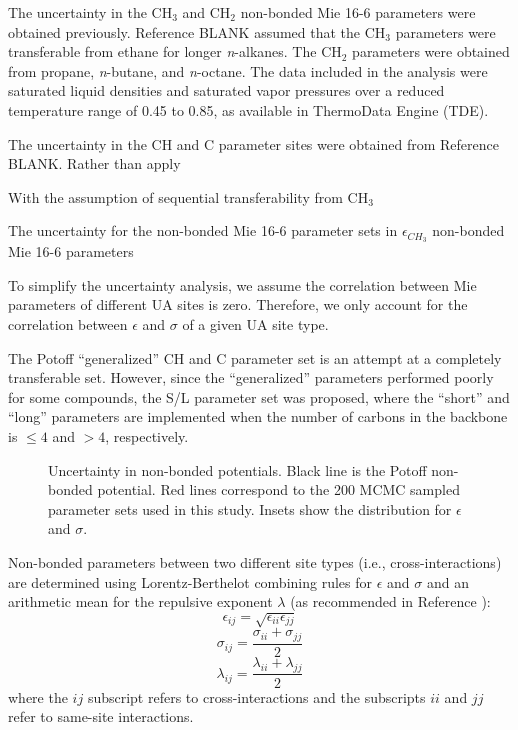 \documentclass[preprint,review,12pt]{elsarticle}
\begin{document}
	The uncertainty in the CH$_3$ and CH$_2$ non-bonded Mie 16-6 parameters were obtained previously. Reference BLANK assumed that the CH$_3$ parameters were transferable from ethane for longer \textit{n}-alkanes. The CH$_2$ parameters were obtained from propane, \textit{n}-butane, and \textit{n}-octane. The data included in the analysis were saturated liquid densities and saturated vapor pressures over a reduced temperature range of 0.45 to 0.85, as available in ThermoData Engine (TDE). 
	
	The uncertainty in the CH and C parameter sites were obtained from Reference BLANK. Rather than apply 
	
	With the assumption of sequential transferability from CH$_3$ 
	
	The uncertainty for the non-bonded Mie 16-6 parameter sets in $\epsilon_{CH_3}$ non-bonded Mie 16-6 parameters
	
	To simplify the uncertainty analysis, we assume the correlation between Mie parameters of different UA sites is zero. Therefore, we only account for the correlation between $\epsilon$ and $\sigma$ of a given UA site type.  
	
	The Potoff ``generalized'' CH and C parameter set is an attempt at a completely transferable set. However, since the ``generalized'' parameters performed poorly for some compounds, the S/L parameter set was proposed, where the ``short'' and ``long'' parameters are implemented when the number of carbons in the backbone is $\le 4$ and $> 4$, respectively.
	
	\begin{figure}[htb!]
	\centering
	\caption{Uncertainty in non-bonded potentials. Black line is the Potoff non-bonded potential. Red lines correspond to the 200 MCMC sampled parameter sets used in this study. Insets show the distribution for $\epsilon$ and $\sigma$.}
		\label{fig:nonbonded_uncertainty}
	\end{figure}
	
	Non-bonded parameters between two different site types (i.e., cross-interactions) are determined using Lorentz-Berthelot combining rules \cite{Allen1987} for $\epsilon$ and $\sigma$ and an arithmetic mean for the repulsive exponent $\lambda$ (as recommended in Reference ):
	\begin{equation} \label{eq:Lorentz-Berthelot_eps}
	\epsilon_{ij} = \sqrt{\epsilon_{ii} \epsilon_{jj}}
	\end{equation}
	\begin{equation} \label{eq:Lorentz-Berthelot_sig}
	\sigma_{ij} = \frac{\sigma_{ii} + \sigma_{jj}}{2}
	\end{equation}
	\begin{equation} \label{eq:Lorentz-Berthelot_lam}
	\lambda_{ij} = \frac{\lambda_{ii} + \lambda_{jj}}{2}
	\end{equation}
	where the $ij$ subscript refers to cross-interactions and the subscripts $ii$ and $jj$ refer to same-site interactions. 
	
\end{document}
